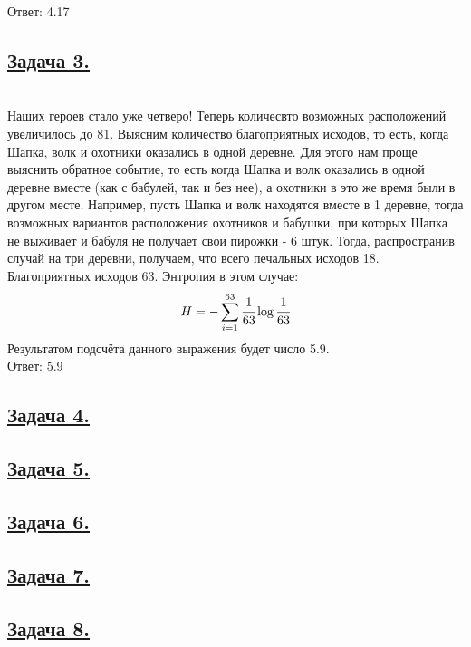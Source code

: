 Ответ: 4.17

\subsection*{\hyperref[sec:problem3]{Задача 3.}}
\label{sec:sol_problem3} \
\\ 

Наших героев стало уже четверо! Теперь количесвто возможных расположений увеличилось до 81. Выясним количество благоприятных исходов, то есть, когда Шапка, волк и охотники оказались в одной деревне. Для этого нам проще выяснить обратное событие, то есть когда Шапка и волк оказались в одной деревне вместе (как с бабулей, так и без нее), а охотники в это же время были в другом месте. Например, пусть Шапка и волк находятся вместе в 1 деревне, тогда возможных вариантов расположения охотников и бабушки, при которых Шапка не выживает и бабуля не получает свои пирожки - 6 штук. Тогда, распространив случай  на три деревни, получаем, что всего печальных исходов 18. Благоприятных исходов 63. Энтропия в этом случае: 
\[H=-\sum\limits_{i=1}^{63}  \cfrac{1}{63}\log \cfrac{1}{63} \]
Результатом подсчёта данного выражения будет число 5.9. \\

Ответ: 5.9

\subsection*{\hyperref[sec:problem4]{Задача 4.}}
\label{sec:sol_problem4}

\subsection*{\hyperref[sec:problem5]{Задача 5.}}\label{sec:sol_problem5}

\subsection*{\hyperref[sec:problem6]{Задача 6.}}\label{sec:sol_problem6}

\subsection*{\hyperref[sec:problem7]{Задача 7.}}\label{sec:sol_problem7}

\subsection*{\hyperref[sec:problem8]{Задача 8.}}\label{sec:sol_problem8}